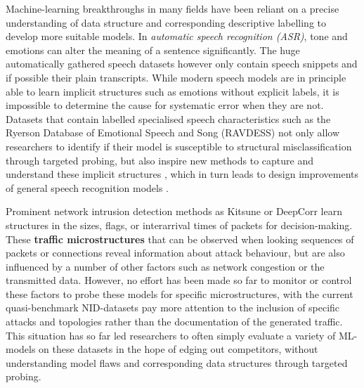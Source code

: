 \documentclass[runningheads]{llncs}
\begin{document}
Machine-learning breakthroughs in many fields have been reliant on a precise understanding of data structure and corresponding descriptive labelling to develop more suitable models.
In \textit{automatic speech recognition (ASR)}, tone and emotions can alter the meaning of a sentence significantly. The huge automatically gathered speech datasets however only contain speech snippets and if possible their plain transcripts. While modern speech models are in principle able to learn implicit structures such as emotions without explicit labels, it is impossible to determine the cause for systematic error when they are not. Datasets that contain labelled specialised speech characteristics such as the Ryerson Database of Emotional Speech and Song (RAVDESS) \cite{livingstone2018ryerson} not only allow researchers to identify if their model is susceptible to structural misclassification through targeted probing, but also inspire new methods to capture and understand these implicit structures \cite{haque2019audio}, which in turn leads to design improvements of general speech recognition models \cite{kamper2020multilingual}.



Prominent network intrusion detection methods as Kitsune \cite{mirsky2018kitsune} or DeepCorr \cite{nasr2018deepcorr} learn structures in the sizes, flags, or interarrival times of packets for decision-making. These \textbf{traffic microstructures} that can be observed when looking sequences of packets or connections reveal information about attack behaviour, but are also influenced by a number of other factors such as network congestion or the transmitted data. However, no effort has been made so far to monitor or control these factors to probe these models for specific microstructures, with the current quasi-benchmark NID-datasets pay more attention to the inclusion of specific attacks and topologies rather than the documentation of the generated traffic. 
This situation has so far led researchers to often simply evaluate a variety of ML-models on these datasets in the hope of edging out competitors, without understanding model flaws and corresponding data structures through targeted probing.
\end{document}
